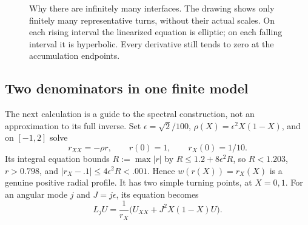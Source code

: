 \begin{figure}[htbp]
\centering
{}
\caption{Why there are infinitely many interfaces. The drawing shows
only finitely many representative turns, without their actual scales.
On each rising interval the linearized equation is elliptic; on each
falling interval it is hyperbolic. Every derivative still tends to
zero at the accumulation endpoints.}
\label{fig:profile-type}
\end{figure}

\subsection{Two denominators in one finite model}
\label{sec:worked-example}

The next calculation is a guide to the spectral construction, not
an approximation to its full inverse. Set $\epsilon=\sqrt2/100$,
$\rho(X)=\epsilon^2X(1-X)$, and on $[-1,2]$ solve
\begin{equation}\label{eq:example-radius}
 r_{XX}=-\rho r,\qquad r(0)=1,\qquad r_X(0)=1/10.
\end{equation}
Its integral equation bounds $R:=\max|r|$ by
$R\le1.2+8\epsilon^2R$, so $R<1.203$,
$r>0.798$, and $|r_X-.1|\le4\epsilon^2R<.001$.
Hence $w(r(X))=r_X(X)$ is a genuine positive radial profile.
It has two simple turning points, at $X=0,1$.
For an angular mode $j$ and $J=j\epsilon$, its equation becomes
\begin{equation}\label{eq:example-mode}
 L_jU=\frac1{r_X}\bigl(U_{XX}+J^2X(1-X)U\bigr).
\end{equation}


